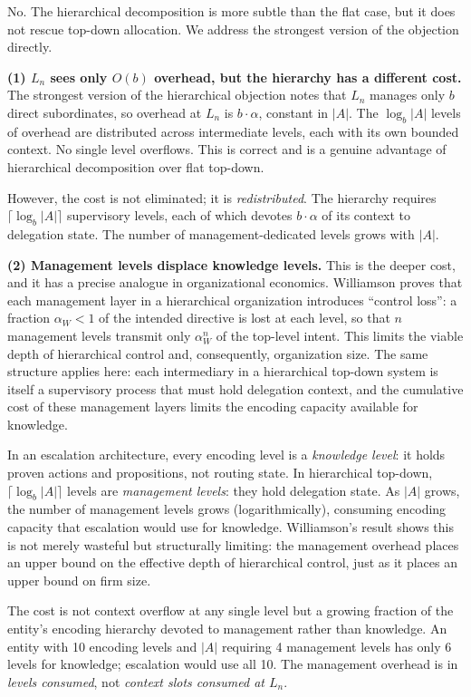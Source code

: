 \documentclass[11pt]{article}
\theoremstyle{definition}
\begin{document}
No. The hierarchical decomposition is more subtle than the flat case,
but it does not rescue top-down allocation. We address the strongest
version of the objection directly.

\textbf{(1) $L_n$ sees only $O(b)$ overhead, but the hierarchy has
a different cost.}
The strongest version of the hierarchical objection notes that $L_n$
manages only $b$ direct subordinates, so overhead at $L_n$ is
$b \cdot \alpha$, constant in $|A|$. The $\log_b |A|$ levels of
overhead are distributed across intermediate levels, each with its own
bounded context. No single level overflows. This is correct and is a
genuine advantage of hierarchical decomposition over flat top-down.

However, the cost is not eliminated; it is \emph{redistributed}.
The hierarchy requires $\lceil \log_b |A| \rceil$ supervisory levels,
each of which devotes $b \cdot \alpha$ of its context to delegation
state. The number of management-dedicated levels grows with $|A|$.

\textbf{(2) Management levels displace knowledge levels.}
This is the deeper cost, and it has a precise analogue in organizational
economics. Williamson \cite{Williamson1967} proves that each management
layer in a hierarchical organization introduces ``control loss'': a
fraction $\alpha_W < 1$ of the intended directive is lost at each level,
so that $n$ management levels transmit only $\alpha_W^n$ of the
top-level intent. This limits the viable depth of hierarchical control
and, consequently, organization size. The same structure applies here:
each intermediary in a hierarchical top-down system is itself a
supervisory process that must hold delegation context, and the
cumulative cost of these management layers limits the encoding
capacity available for knowledge.

In an escalation architecture, every encoding level is a
\emph{knowledge level}: it holds proven actions and propositions, not
routing state. In hierarchical top-down, $\lceil \log_b |A| \rceil$
levels are \emph{management levels}: they hold delegation state. As
$|A|$ grows, the number of management levels grows (logarithmically),
consuming encoding capacity that escalation would use for knowledge.
Williamson's result shows this is not merely wasteful but structurally
limiting: the management overhead places an upper bound on the
effective depth of hierarchical control, just as it places an upper
bound on firm size.

The cost is not context overflow at any single level but a growing
fraction of the entity's encoding hierarchy devoted to management rather
than knowledge. An entity with 10 encoding levels and $|A|$ requiring
4 management levels has only 6 levels for knowledge; escalation would
use all 10. The management overhead is in \emph{levels consumed}, not
\emph{context slots consumed at $L_n$}.
\end{document}

